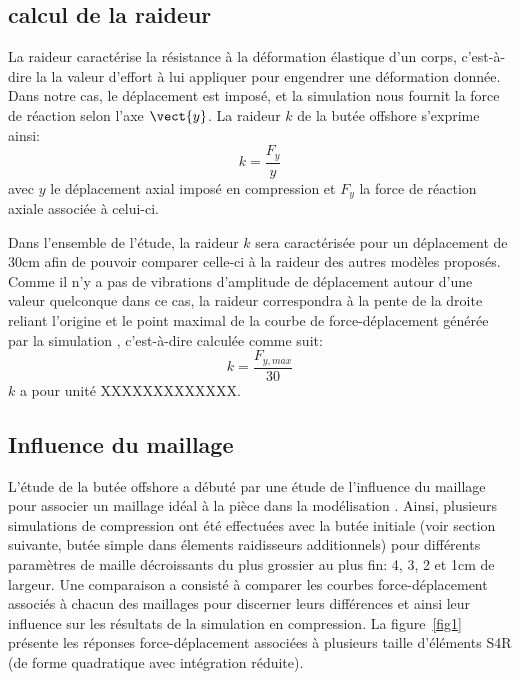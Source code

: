 ﻿ \documentclass{article}
\newcommand{\abaqus}{\bsc{Abaqus}\xspace}
\begin{document}
\subsection{calcul de la raideur}

La raideur caractérise la résistance à la déformation élastique d'un corps, c'est-à-dire la la valeur d'effort à lui appliquer pour engendrer une déformation donnée. Dans notre cas, le déplacement est imposé, et la simulation \abaqus nous fournit la force de réaction selon l'axe $\vect{y}$. La raideur $k$ de la butée offshore s'exprime ainsi:
\begin{displaymath}
		k=\frac{F_{y}}{y}
	\end{displaymath}
avec $y$ le déplacement axial imposé en compression et $F_{y}$ la force de réaction axiale associée à celui-ci. 

Dans l'ensemble de l'étude, la raideur $k$ sera caractérisée pour un déplacement de 30cm afin de pouvoir comparer celle-ci à la raideur des autres modèles proposés. Comme il n'y a pas de vibrations d'amplitude de déplacement autour d'une valeur quelconque dans ce cas, la raideur correspondra à la pente de la droite reliant l'origine et le point maximal de la courbe de force-déplacement générée par la simulation \abaqus, c'est-à-dire calculée comme suit:
\begin{displaymath}
		k=\frac{F_{y,max}}{30}
	\end{displaymath}
$k$ a pour unité XXXXXXXXXXXXX.


\subsection{Influence du maillage}

L'étude de la butée offshore a débuté par une étude de l'influence du maillage pour associer un maillage idéal à la pièce dans la modélisation \Abaqus. Ainsi, plusieurs simulations de compression ont été effectuées avec la butée initiale (voir section suivante, butée simple dans élements raidisseurs additionnels) pour différents paramètres de maille décroissants du plus grossier au plus fin: 4, 3, 2 et 1cm de largeur.
Une comparaison a consisté à comparer les courbes force-déplacement associés à chacun des maillages pour discerner leurs différences et ainsi leur influence sur les résultats de la simulation en compression. La figure~\ref{fig1} présente les réponses force-déplacement associées à plusieurs taille d'éléments S4R (de forme quadratique avec intégration réduite).
\end{document}
